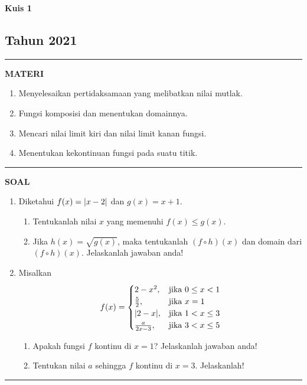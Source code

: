 \begin{flushright}
    \textbf{\Large{Kuis 1}}
    \subsection*{Tahun 2021}
\end{flushright}
\vspace{0.5cm}
\hrule height 2pt
\vspace{0.5cm}
\begin{center}
    \textbf{\large{MATERI}}
    \begin{enumerate}[leftmargin=*, label={\arabic*}.]
        \item Menyelesaikan pertidaksamaan yang melibatkan nilai mutlak.
        \item Fungsi komposisi dan menentukan domainnya.
        \item Mencari nilai limit kiri dan nilai limit kanan fungsi.
        \item Menentukan kekontinuan fungsi pada suatu titik.
    \end{enumerate}
\end{center}
\vspace{0.2cm}
\hrule height 1pt
\vspace{0.5cm}
\begin{center}
    \textbf{\large{SOAL}}
\end{center}
\begin{enumerate}[leftmargin=*, label={\arabic*}.]
\item Diketahui 
$f(x) = \lvert x-2\rvert$ dan 
$g(x) = x+1$.
\begin{enumerate}[label={\alph*}.]
    \item Tentukanlah nilai $x$ yang memenuhi $f(x) \leq g(x)$.
    \item Jika 
    $h(x) = \sqrt{g(x)}$, maka tentukanlah 
    $(f \circ h)(x)$ dan domain dari
    $(f \circ h)(x)$. Jelaskanlah jawaban anda!
\end{enumerate}
\item Misalkan
\[
    f(x) = 
    \begin{cases}
        2-x^{2}, &\text{jika $0 \leq x < 1$}\\
        \frac{5}{2}, &\text{jika $x = 1$}\\
        \lvert2-x\rvert, &\text{jika $1 < x \leq 3$}\\
        \frac{a}{2x-3}, &\text{jika $3 < x \leq 5$}
    \end{cases}
\]
\begin{enumerate}[label={\alph*}.]
    \item Apakah fungsi $f$ kontinu di $x=1$? Jelaskanlah jawaban anda!
    \item Tentukan nilai $a$ sehingga $f$ kontinu di $x=3$. Jelaskanlah!
\end{enumerate}
\end{enumerate}
\vspace{0.2cm}
\hrule height 1pt
\vspace{0.5cm}

